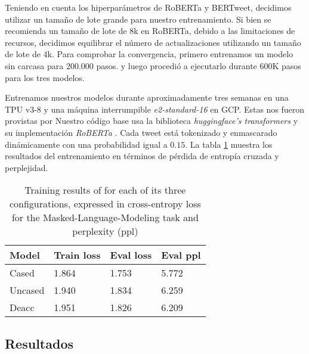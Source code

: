Teniendo en cuenta los hiperparámetros de RoBERTa y BERTweet, decidimos utilizar un tamaño de lote grande para nuestro entrenamiento. Si bien se recomienda un tamaño de lote de 8k en RoBERTa, debido a las limitaciones de recursos, decidimos equilibrar el número de actualizaciones utilizando un tamaño de lote de 4k. Para comprobar la convergencia, primero entrenamos un modelo sin carcasa para 200.000 pasos. y luego procedió a ejecutarlo durante 600K pasos para los tres modelos.

Entrenamos nuestros modelos durante aproximadamente tres semanas en una TPU v3-8 y una máquina interrumpible \emph{e2-standard-16} en GCP. Estas nos fueron provistas por  Nuestro código base usa la biblioteca \emph{huggingface's transformers} y su implementación \emph{RoBERTa} \citet{wolf-etal-2020-transformers}. Cada tweet está tokenizado y enmascarado dinámicamente con una probabilidad igual a $ 0.15 $. La tabla \ref{tab:training_results} muestra los resultados del entrenamiento en términos de pérdida de entropía cruzada y perplejidad.

\begin{table}[t]
    \centering
    \begin{tabular}{l|l|l|l}
        Model   & Train loss & Eval loss   & Eval ppl \\
        \hline
        Cased   & 1.864      & 1.753       & 5.772    \\
        Uncased & 1.940      & 1.834       & 6.259    \\
        Deacc   & 1.951      & 1.826       & 6.209
    \end{tabular}
    \caption{Training results of \robertuito{} for each of its three configurations, expressed in cross-entropy loss for the Masked-Language-Modeling task and perplexity (ppl)}
    \label{tab:training_results}
\end{table}


\subsection{Resultados}

